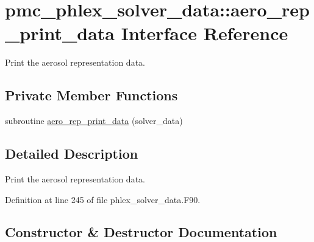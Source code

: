 \hypertarget{interfacepmc__phlex__solver__data_1_1aero__rep__print__data}{}\section{pmc\+\_\+phlex\+\_\+solver\+\_\+data\+:\+:aero\+\_\+rep\+\_\+print\+\_\+data Interface Reference}
\label{interfacepmc__phlex__solver__data_1_1aero__rep__print__data}


Print the aerosol representation data.  


\subsection*{Private Member Functions}
\begin{DoxyCompactItemize}
\item 
subroutine \mbox{\hyperlink{interfacepmc__phlex__solver__data_1_1aero__rep__print__data_a65fcf65ca7e47a9addf389148e264280}{aero\+\_\+rep\+\_\+print\+\_\+data}} (solver\+\_\+data)
\end{DoxyCompactItemize}


\subsection{Detailed Description}
Print the aerosol representation data. 

Definition at line 245 of file phlex\+\_\+solver\+\_\+data.\+F90.



\subsection{Constructor \& Destructor Documentation}
\mbox{\label{interfacepmc__phlex__solver__data_1_1aero__rep__print__data_a65fcf65ca7e47a9addf389148e264280}} 
